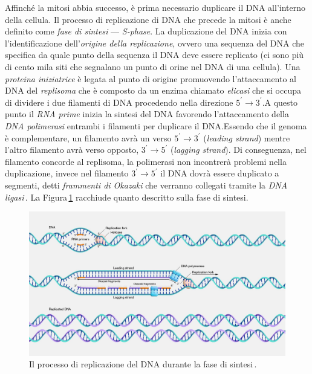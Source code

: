 Affinché la mitosi abbia successo, è prima necessario duplicare il DNA all'interno della cellula. Il processo di replicazione di DNA che precede la mitosi è anche definito come \textsl{fase di sintesi} — \textit{S-phase}. La duplicazione del DNA inizia con l'identificazione dell'\textsl{origine della replicazione}, ovvero una sequenza del DNA che specifica da quale punto della sequenza il DNA deve essere replicato (ci sono più di cento mila siti che segnalano un punto di orine nel DNA di una cellula). Una \textsl{proteina iniziatrice} è legata al punto di origine promuovendo l'attaccamento al DNA del \textsl{replisoma} che è composto da un enzima chiamato \textsl{elicasi} che si occupa di dividere i due filamenti di DNA procedendo nella direzione $5^\prime \to 3^\prime$.\@ A questo punto il \textsl{RNA prime} inizia la sintesi del DNA favorendo l'attaccamento della \textsl{DNA polimerasi} entrambi i filamenti per duplicare il DNA.\@ Essendo che il genoma è complementare, un filamento avrà un verso $5^\prime \to 3^\prime$ (\textit{leading strand}) mentre l'altro filamento avrà verso opposto, $3^\prime \to 5^\prime$ (\textit{lagging strand}). Di conseguenza, nel filamento concorde al replisoma, la polimerasi non incontrerà problemi nella duplicazione, invece nel filamento $3^\prime \to 5^\prime$ il DNA dovrà essere duplicato a segmenti, detti \textsl{frammenti di Okazaki} che verranno collegati tramite la \textsl{DNA ligasi}\,\cite{laskey1989s, bell2002dna, dutta1997initiation, 2017727}. La Figura\,\ref{fig:dna-replication} racchiude quanto descritto sulla fase di sintesi.

\begin{figure}[b!]
    \centering
    \includegraphics[width=\textwidth]{assets/dna-replication.jpg}
    \caption[Il processo di replicazione del DNA.]{Il processo di replicazione del DNA durante la fase di sintesi\,\cite{nhgri_dna_replication_image}.}\label{fig:dna-replication}
\end{figure}


